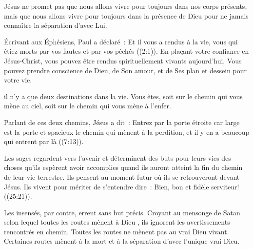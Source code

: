 Jésus ne promet pas que nous allons vivre pour toujours
 dans nos corps présents, mais que nous allons vivre pour toujours
 dans la présence de Dieu
 \ocadr pour ne jamais connaître la séparation d'avec Lui. 

Écrivant aux Éphésiens, Paul a déclaré~:
 \og Et il vous a rendus à la vie, vous qui étiez morts par vos fautes
 et par vos péchés \fg{} ((2:1)).
 En plaçant votre confiance en Jésus-Christ, vous pouvez être rendus
 spirituellement vivants aujourd'hui.
 Vous pouvez prendre conscience de Dieu, de Son amour, et de Ses plan
 et dessein pour votre vie. 

\dvrule







 il n'y a que deux destinations dans la vie.
 Vous êtes, soit sur le chemin qui vous mène au ciel,
 soit sur le chemin qui vous mène à l'enfer.

Parlant de ces deux chemins, Jésus a dit~: 
 \og Entrez par la porte étroite car large est la porte et spacieux le chemin
 qui mènent à la perdition,
 et il y en a beaucoup qui entrent par là \fg{}
 ((7:13)).


Les sages regardent vers l'avenir et déterminent des buts pour leurs vies
 \ocadr des choses qu'ils espèrent avoir accomplies quand ils auront atteint
 la fin du chemin de leur vie terrestre.
 Ils pensent au moment futur où ils se retrouveront devant Jésus.
 Ils vivent pour mériter de s'entendre dire~: 
 \og Bien, bon et fidèle serviteur! \fg{} ((25:21)).

Les insensés, par contre, errent sans but précis.
 Croyant au mensonge de Satan selon lequel
 \og toutes les routes mènent à Dieu \fg{},
 ils ignorent les avertissements rencontrés en chemin.
 Toutes les routes ne mènent pas au vrai Dieu vivant.
 Certaines routes mènent à la mort
 \ocadr et à la séparation d'avec l'unique vrai Dieu.

